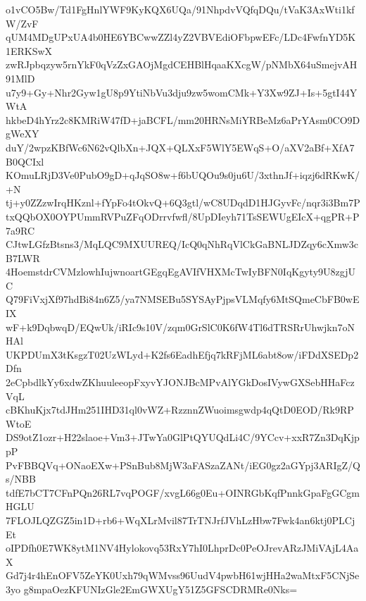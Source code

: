 o1vCO5Bw/Td1FgHnlYWF9KyKQX6UQa/91NhpdvVQfqDQu/tVaK3AxWti1kfW/ZvF
qUM4MDgUPxUA4b0HE6YBCwwZZl4yZ2VBVEdiOFbpwEFc/LDc4FwfnYD5K1ERKSwX
zwRJpbqzyw5rnYkF0qVzZxGAOjMgdCEHBlHqaaKXcgW/pNMbX64uSmejvAH91MlD
u7y9+Gy+Nhr2Gyw1gU8p9YtiNbVu3dju9zw5womCMk+Y3Xw9ZJ+Is+5gtI44YWtA
hkbeD4hYrz2c8KMRiW47fD+jaBCFL/mm20HRNsMiYRBeMz6aPrYAsm0CO9DgWeXY
duY/2wpzKBfWc6N62vQlbXn+JQX+QLXxF5WlY5EWqS+O/aXV2aBf+XfA7B0QCIxl
KOmuLRjD3Ve0PubO9gD+qJqSO8w+f6bUQOu9s0ju6U/3xthnJf+iqzj6dRKwK/+N
tj+y0ZZzwIrqHKznl+fYpFo4tOkvQ+6Q3gtl/wC8UDqdD1HJGyvFc/nqr3i3Bm7P
txQQbOX0OYPUmmRVPuZFqODrrvfwfl/8UpDIeyh71TsSEWUgEIcX+qgPR+P7a9RC
CJtwLGfzBtsns3/MqLQC9MXUUREQ/IcQ0qNhRqVlCkGaBNLJDZqy6cXmw3cB7LWR
4HoemstdrCVMzlowhIujwnoartGEgqEgAVIfVHXMcTwIyBFN0IqKgyty9U8zgjUC
Q79FiVxjXf97hdBi84n6Z5/ya7NMSEBu5SYSAyPjpsVLMqfy6MtSQmeCbFB0wEIX
wF+k9DqbwqD/EQwUk/iRIc9s10V/zqm0GrSlC0K6fW4Tl6dTRSRrUhwjkn7oNHAl
UKPDUmX3tKsgzT02UzWLyd+K2fs6EadhEfjq7kRFjML6abt8ow/iFDdXSEDp2Dfn
2eCpbdlkYy6xdwZKhuuleeopFxyvYJONJBcMPvAlYGkDosIVywGXSebHHaFczVqL
cBKhuKjx7tdJHm251IHD31ql0vWZ+RzznnZWuoimsgwdp4qQtD0EOD/Rk9RPWtoE
DS9otZ1ozr+H22slaoe+Vm3+JTwYa0GlPtQYUQdLi4C/9YCcv+xxR7Zn3DqKjppP
PvFBBQVq+ONaoEXw+PSnBub8MjW3aFASzaZANt/iEG0gz2aGYpj3ARIgZ/Qs/NBB
tdfE7bCT7CFnPQn26RL7vqPOGF/xvgL66g0Eu+OINRGbKqfPnnkGpaFgGCgmHGLU
7FLOJLQZGZ5in1D+rb6+WqXLrMvil87TrTNJrfJVhLzHbw7Fwk4an6ktj0PLCjEt
oIPDfh0E7WK8ytM1NV4Hylokovq53RxY7hI0LhprDc0PeOJrevARzJMiVAjL4AaX
Gd7j4r4hEnOFV5ZeYK0Uxh79qWMvss96UudV4pwbH61wjHHa2waMtxF5CNjSe3yo
g8mpaOezKFUNIzGle2EmGWXUgY51Z5GFSCDRMRe0Nks=
